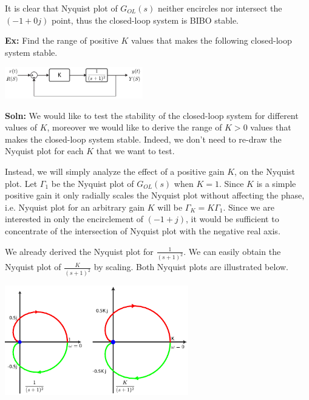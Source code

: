 \documentclass{article}
\begin{document}
\vspace{3 pt}

It is clear that Nyquist plot of $G_{OL}(s)$ neither encircles nor
intersect the $(-1 + 0 j)$ point, thus the closed-loop system is 
BIBO stable. 

\vspace{6 pt}

\textbf{Ex:} Find the range of positive $K$ values that makes the following
closed-loop system stable.

\vspace{6 pt}

  \begin{minipage}[h]{1\linewidth}
    \begin{center}
      \includegraphics[width=0.45\textwidth]{ex2block}
    \end{center}
  \end{minipage}

\vspace{6 pt}

\textbf{Soln:} We would like to test the stability of the closed-loop system
for different values of $K$, moreover we would like to derive 
the range of $K > 0$ values that makes the closed-loop system 
stable. Indeed, we don't need to re-draw the Nyquist plot
for each $K$ that we want to test. 

Instead, we will simply analyze the
effect of a positive gain $K$, on the Nyquist plot. Let 
$\Gamma_1$ be the Nyquist plot of $G_{OL}(s)$ when $K = 1$. Since $K$
is a simple positive gain it only radially scales the Nyquist plot
without affecting the phase, i.e. Nyquist plot for an arbitrary gain
$K$ will be $\Gamma_K = K \Gamma_1$. Since we are interested in only
the encirclement  of $(-1 + j)$, it would be sufficient to concentrate of the 
intersection of Nyquist plot with the negative real axis. 

We already derived the Nyquist plot for $\frac{1}{(s+1)^2}$. 
We can easily obtain the Nyquist plot of $\frac{K}{(s+1)^2}$
by scaling. Both Nyquist plots are illustrated below. 

\vspace{6 pt}

  \begin{minipage}[h]{1\linewidth}
    \begin{center}
      \includegraphics[width=0.6\textwidth]{exK}
    \end{center}
  \end{minipage}
\end{document}
